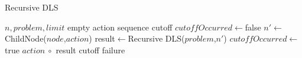 \documentclass[10pt, letterpaper]{report}
\begin{document}
 \begin{algorithm}
    \caption{Recursive DLS}\label{alg:EDLS}
    \begin{algorithmic}
    \Require $n,problem,limit$
    \State\Return empty action sequence
    \EndIf
    \State\Return cutoff
    \EndIf
    \State $cutoffOccurred\leftarrow $false
    \State $n'\leftarrow$ChildNode($node$,$action$)
    \State result$\leftarrow$Recursive DLS($problem$,$n'$)
    \State $cutoffOccurred\leftarrow $true
    \Else
    \State\Return $action \ \circ$ result
    \EndIf
    \EndIf
    \EndFor
    \State\Return cutoff 
    \EndIf
    \State\Return failure
    \end{algorithmic}
\end{algorithm}
\end{document}
